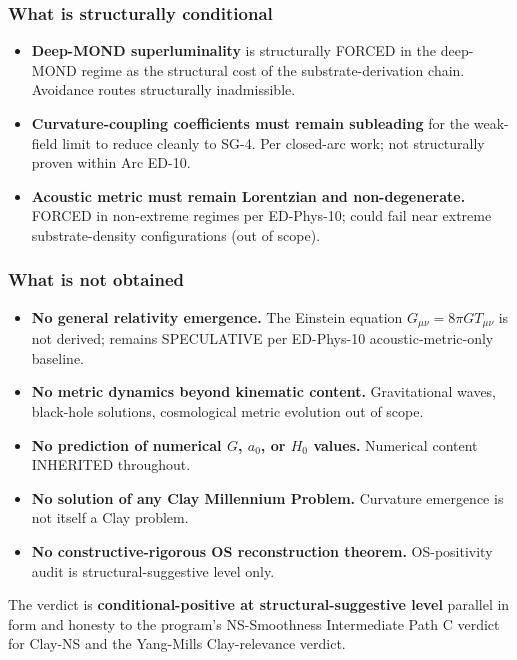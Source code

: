 \documentclass[
]{article}
\providecommand{\tightlist}{%
  \setlength{\itemsep}{0pt}\setlength{\parskip}{0pt}}
\begin{document}
\subsubsection{What is structurally
conditional}\label{what-is-structurally-conditional}

\begin{itemize}
\tightlist
\item
  \textbf{Deep-MOND superluminality} is structurally FORCED in the
  deep-MOND regime as the structural cost of the substrate-derivation
  chain. Avoidance routes structurally inadmissible.
\item
  \textbf{Curvature-coupling coefficients must remain subleading} for
  the weak-field limit to reduce cleanly to SG-4. Per closed-arc work;
  not structurally proven within Arc ED-10.
\item
  \textbf{Acoustic metric must remain Lorentzian and non-degenerate.}
  FORCED in non-extreme regimes per ED-Phys-10; could fail near extreme
  substrate-density configurations (out of scope).
\end{itemize}

\subsubsection{What is not obtained}\label{what-is-not-obtained}

\begin{itemize}
\tightlist
\item
  \textbf{No general relativity emergence.} The Einstein equation
  \(G_{\mu\nu} = 8\pi G T_{\mu\nu}\) is not derived; remains SPECULATIVE
  per ED-Phys-10 acoustic-metric-only baseline.
\item
  \textbf{No metric dynamics beyond kinematic content.} Gravitational
  waves, black-hole solutions, cosmological metric evolution out of
  scope.
\item
  \textbf{No prediction of numerical \(G\), \(a_0\), or \(H_0\) values.}
  Numerical content INHERITED throughout.
\item
  \textbf{No solution of any Clay Millennium Problem.} Curvature
  emergence is not itself a Clay problem.
\item
  \textbf{No constructive-rigorous OS reconstruction theorem.}
  OS-positivity audit is structural-suggestive level only.
\end{itemize}

The verdict is \textbf{conditional-positive at structural-suggestive
level} parallel in form and honesty to the program's NS-Smoothness
Intermediate Path C verdict for Clay-NS and the Yang-Mills
Clay-relevance verdict.
\end{document}
